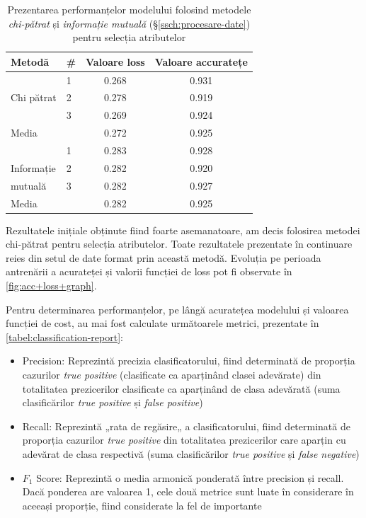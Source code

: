 \begin{table}[ht]
\centering
\caption{Prezentarea performanțelor modelului folosind metodele \textit{chi-pătrat} și \textit{informație mutuală} (\S\ref{ssch:procesare-date}) pentru selecția atributelor}
\label{tabel:acc+loss+comparison}
\renewcommand{\arraystretch}{1.2}
\begin{tabular}{@{}llcc@{}}
\toprule
Metodă & \# & Valoare loss & Valoare accuratețe \\ \midrule
& 1 & 0.268 & 0.931 \\
Chi pătrat & 2 & 0.278 & 0.919 \\
& 3 & 0.269 & 0.924 \\ \cmidrule(lr{1em}){3-4}
Media & & 0.272 & 0.925 \\ \midrule
& 1 & 0.283 & 0.928 \\
Informație & 2 & 0.282 & 0.920 \\
mutuală & 3 & 0.282 & 0.927 \\ \cmidrule(lr{1em}){3-4}
Media & & 0.282 & 0.925 \\ \bottomrule
\end{tabular}
\end{table}

Rezultatele inițiale obținute fiind foarte asemanatoare, am decis folosirea metodei chi-pătrat pentru selecția atributelor. Toate rezultatele prezentate în continuare reies din setul de date format prin această metodă. Evoluția pe perioada antrenării a acurateței și valorii funcției de loss pot fi observate în \autoref{fig:acc+loss+graph}.

Pentru determinarea performanțelor, pe lângă acuratețea modelului și valoarea funcției de cost, au mai fost calculate următoarele metrici, prezentate în \autoref{tabel:classification-report}:
\begin{itemize}
\item Precision: Reprezintă precizia clasificatorului, fiind determinată de proporția cazurilor \textit{true positive} (clasificate ca aparținând clasei adevărate) din totalitatea prezicerilor clasificate ca aparținând de clasa adevărată (suma clasificărilor \textit{true positive} și \textit{false positive})
\item Recall: Reprezintă „rata de regăsire„ a clasificatorului, fiind determinată de proporția cazurilor \textit{true positive} din totalitatea prezicerilor care aparțin cu adevărat de clasa respectivă (suma clasificărilor \textit{true positive} și \textit{false negative})
\item $F_1$ Score: Reprezintă o media armonică ponderată între precision și recall. Dacă ponderea are valoarea 1, cele două metrice sunt luate în considerare în aceeași proporție, fiind considerate la fel de importante
\end{itemize}

